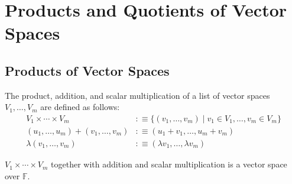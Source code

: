 \section{Products and Quotients of Vector Spaces}
\subsection{Products of Vector Spaces}

\setcounter{thm}{86}
\begin{mydef} 
  The product, addition, and scalar multiplication of a list of vector spaces $V_1, \dots, V_m$ are defined as follows:
  \begin{equation}
    \begin{aligned}
      V_1 \times \cdots \times V_m &:\equiv \{ (v_1, \dots, v_m) \mid v_1 \in V_1, \dots, v_m \in V_m\} \\
      (u_1, \dots, u_m) + (v_1, \dots, v_m) &:\equiv (u_1+v_1, \dots, u_m+v_m) \\
      \lambda (v_1, \dots, v_m) &:\equiv (\lambda v_1, \dots, \lambda v_m)
    \end{aligned}
  \end{equation}
\end{mydef}

\setcounter{thm}{88}
\begin{thm} 
  $V_1 \times \cdots \times V_m$ together with addition and scalar multiplication is a vector space over $\mathbb{F}$.
\end{thm}

